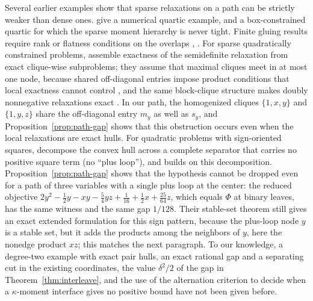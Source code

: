 Several earlier examples show that sparse relaxations on a path can be
strictly weaker than dense ones. \citet[Example~3.5]{NieDemmel2009} give a
numerical quartic example, and \citet[Example~6.7]{NieQuTangZhang2026} a
box-constrained quartic for which the sparse moment hierarchy is never
tight. Finite gluing results require rank or flatness conditions on the
overlaps \citep[Theorem~3.7]{Lasserre2006}, \citep{FantuzziFuentes2025}. For
sparse quadratically constrained problems, \citet{KojimaKimArima2026} assemble
exactness of the semidefinite relaxation from exact clique-wise subproblems;
they assume that maximal cliques meet in at most one node, because shared
off-diagonal entries impose product conditions that local exactness cannot
control \citep[Section~3.3]{KojimaKimArima2026}, and the same block-clique
structure makes doubly nonnegative relaxations exact
\citep{KimKojimaToh2020}. In our path, the homogenized cliques $\{1,x,y\}$ and
$\{1,y,z\}$ share the off-diagonal entry $m_y$ as well as $s_y$, and
Proposition~\ref{prop:path-gap} shows that this obstruction occurs even when
the local relaxations are exact hulls.
For quadratic problems with sign-oriented squares,
\citet[Corollary~1]{DeyKhajavirad2025} decompose the convex hull across a
complete separator that carries no positive square term (no ``plus loop''),
and \citet{Khajavirad2026} builds on this decomposition.
Proposition~\ref{prop:path-gap} shows that the hypothesis cannot be dropped
even for a path of three variables with a single plus loop at the center:
the reduced objective
$2y^2-\tfrac12y-xy-\tfrac54yz+\tfrac1{16}+\tfrac12x+\tfrac{25}{64}z$, which
equals $\Phi$ at binary leaves, has the same witness and the same gap $1/128$.
Their stable-set theorem \citep[Theorem~2 and Corollary~4]{DeyKhajavirad2025} still gives an
exact extended formulation for this sign pattern, because the plus-loop node
$y$ is a stable set, but it adds the products among the neighbors of $y$,
here the nonedge product $xz$; this matches the next paragraph. To our
knowledge, a degree-two example with exact pair hulls, an exact rational gap
and a separating cut in the existing coordinates, the value $\delta^2/2$ of
the gap in Theorem~\ref{thm:interleave}, and the use of the alternation
criterion to decide when a $\kappa$-moment interface gives no positive bound
have not been given before.

